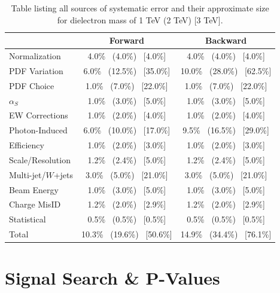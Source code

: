 \begin {table}[h]
\begin{center}
\begin{tabular}{ | l | c c | }
                                & Forward                           & Backward                      \\
            \hline
            Normalization       & 4.0\% ~(4.0\%) ~[4.0\%]           & 4.0\% ~(4.0\%) ~[4.0\%] \\
            PDF Variation       & 6.0\% ~(12.5\%) ~[35.0\%]         & 10.0\% ~(28.0\%) ~[62.5\%] \\
            PDF Choice          & 1.0\% ~(7.0\%) ~[22.0\%]          & 1.0\% ~(7.0\%) ~[22.0\%] \\
            $\alpha_S$          & 1.0\% ~(3.0\%) ~[5.0\%]           & 1.0\% ~(3.0\%) ~[5.0\%] \\
            EW Corrections      & 1.0\% ~(2.0\%) ~[4.0\%]           & 1.0\% ~(2.0\%) ~[4.0\%] \\
            Photon-Induced      & 6.0\% ~(10.0\%) ~[17.0\%]         & 9.5\% ~(16.5\%) ~[29.0\%]    \\
            Efficiency          & 1.0\% ~(2.0\%) ~[3.0\%]           & 1.0\% ~(2.0\%) ~[3.0\%] \\
            Scale/Resolution    & 1.2\% ~(2.4\%) ~[5.0\%]           & 1.2\% ~(2.4\%) ~[5.0\%] \\
            Multi-jet/$W$+jets  & 3.0\% ~(5.0\%) ~[21.0\%]          & 3.0\% ~(5.0\%) ~[21.0\%] \\
            Beam Energy         & 1.0\% ~(3.0\%) ~[5.0\%]           & 1.0\% ~(3.0\%) ~[5.0\%] \\
            Charge MisID        & 1.2\% ~(2.0\%) ~[2.9\%]           & 1.2\% ~(2.0\%) ~[2.9\%] \\
            Statistical         & 0.5\% ~(0.5\%) ~[0.5\%]           & 0.5\% ~(0.5\%) ~[0.5\%] \\
            \hline   
            Total               & 10.3\% ~(19.6\%) ~[50.6\%]        & 14.9\% ~(34.4\%) ~[76.1\%] \\ 
            \hline
        \end{tabular}
        \caption{Table listing all sources of systematic error and their approximate size for dielectron mass of 1 TeV (2 TeV) [3 TeV].}
        \label{tab:sys}
        \end{center}
    \end {table}




\section{Signal Search \& P-Values}

